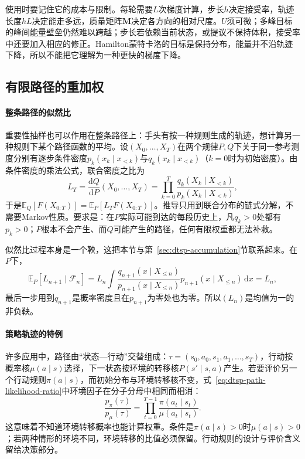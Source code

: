 使用时要记住它的成本与限制。每轮需要$L$次梯度计算，步长$h$决定接受率，轨迹长度$hL$决定能走多远，质量矩阵$\bm M$决定各方向的相对尺度。$U$须可微；多峰目标的峰间能量壁垒仍然难以跨越；步长若依赖当前状态，或提议不保持体积，接受率中还要加入相应的修正。Hamilton蒙特卡洛的目标是保持分布，能量并不沿轨迹下降，所以不能把它理解为一种更快的梯度下降。

\subsection{有限路径的重加权}
\label{sec:dtsp-path-reweighting}

\paragraph{整条路径的似然比}
重要性抽样也可以作用在整条路径上：手头有按一种规则生成的轨迹，想计算另一种规则下某个路径函数的平均。设$(X_0,\ldots,X_T)$在两个规律$P,Q$下关于同一参考测度分别有逐步条件密度$p_k(x_k\mid x_{<k})$与$q_k(x_k\mid x_{<k})$（$k=0$时为初始密度）。由条件密度的乘法公式，联合密度之比为
\begin{equation}
  L_T=\frac{\mathrm dQ}{\mathrm dP}(X_0,\ldots,X_T)=\prod_{k=0}^T\frac{q_k(X_k\mid X_{<k})}{p_k(X_k\mid X_{<k})},
  \label{eq:dtsp-path-likelihood-ratio}
\end{equation}
于是$\mathbb E_Q[F(X_{0:T})]=\mathbb E_P[L_TF(X_{0:T})]$。推导只用到联合分布的链式分解，不需要Markov性质。要求是：在$P$实际可能到达的每段历史上，凡$q_k>0$处都有$p_k>0$；$P$根本不会产生、而$Q$可能产生的路径，任何有限权重都无法补救。

似然比过程本身是一个鞅，这把本节与第~\ref{sec:dtsp-accumulation}节联系起来。在$P$下，
\[
  \mathbb E_P[L_{n+1}\mid\mathcal F_n]=L_n\int\frac{q_{n+1}(x\mid X_{\leq n})}{p_{n+1}(x\mid X_{\leq n})}p_{n+1}(x\mid X_{\leq n})\,\mathrm dx=L_n,
\]
最后一步用到$q_{n+1}$是概率密度且在$p_{n+1}$为零处也为零。所以$(L_n)$是均值为一的非负鞅。

\paragraph{策略轨迹的特例}
许多应用中，路径由“状态—行动”交替组成：$\tau=(s_0,a_0,s_1,a_1,\ldots,s_T)$，行动按概率核$\mu(a\mid s)$选择，下一状态按环境的转移核$P(s'\mid s,a)$产生。若要评价另一个行动规则$\pi(a\mid s)$，而初始分布与环境转移核不变，式~\eqref{eq:dtsp-path-likelihood-ratio}中环境因子在分子分母中相同而相消：
\begin{equation}
  \frac{p_\pi(\tau)}{p_\mu(\tau)}=\prod_{t=0}^{T-1}\frac{\pi(a_t\mid s_t)}{\mu(a_t\mid s_t)}.
  \label{eq:dtsp-policy-ratio}
\end{equation}
这意味着不知道环境转移概率也能计算权重。条件是$\pi(a\mid s)>0$时$\mu(a\mid s)>0$；若两种情形的环境不同，环境转移的比值必须保留。行动规则的设计与评价含义留给决策部分。

